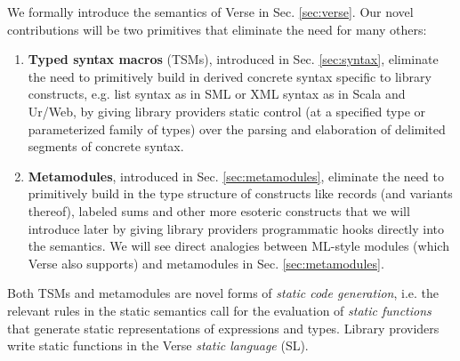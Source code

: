 We formally introduce the semantics of Verse in Sec. \ref{sec:verse}. Our novel contributions will be two primitives that eliminate the need for many others:
\begin{enumerate}
\item \textbf{Typed syntax macros} (TSMs), introduced in Sec. \ref{sec:syntax}, eliminate the need to primitively build in derived concrete syntax specific to library constructs, e.g. list syntax as in SML or XML syntax as in Scala and Ur/Web, by giving library providers static control (at a specified type or parameterized family of types) over the parsing and elaboration of delimited segments of concrete syntax. %
\item \textbf{Metamodules}, introduced in Sec. \ref{sec:metamodules}, eliminate the need to primitively build in the type structure of constructs like records (and variants thereof),  labeled sums and other more esoteric constructs that we will introduce later by giving library providers programmatic hooks directly into the semantics. %
We will see direct analogies between ML-style modules (which Verse also supports) and metamodules in Sec. \ref{sec:metamodules}.
\end{enumerate} 
Both TSMs and metamodules are novel forms of \emph{static code generation}, i.e. the relevant rules in the static semantics call for the evaluation of \emph{static functions} that generate static representations of expressions and types. Library providers write static functions in the Verse \emph{static language} (SL). %


